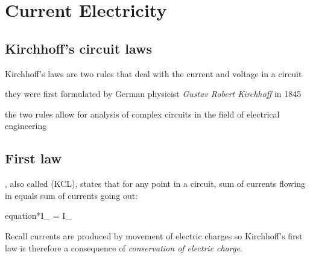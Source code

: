 \section{Current Electricity}




\subsection{Kirchhoff's circuit laws}

Kirchhoff's laws are two rules that deal with the current and voltage in a circuit

they were first formulated by German physicist \emph{Gustav Robert Kirchhoff} in 1845

the two rules allow for analysis of complex circuits in the field of electrical engineering

\subsection{First law}

\begin{ilight}
	, also called  (KCL), states that for any point in a circuit, sum of currents flowing in equals sum of currents going out: \begin{empheq}[box=\tcbhighmath]{equation*}{\sum I_ = \sum I_}\end{empheq}
\end{ilight}

Recall currents are produced by movement of electric charges so Kirchhoff's first law is therefore a consequence of \emph{conservation of electric charge}. 

\begin{marginfigure}
	\vspace{-21pt}
	\begin{center}
	\end{center}
	\vspace{-20pt}
\end{marginfigure}

